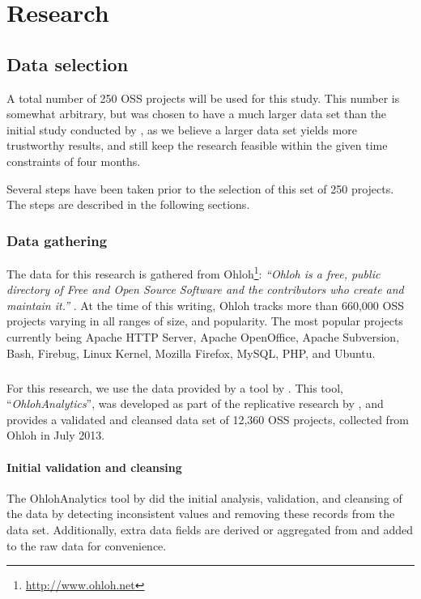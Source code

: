 \chapter{Research}
\label{research}

\section{Data selection}
\label{method:data}
A total number of 250 OSS projects will be used for this study. This number is
somewhat arbitrary, but was chosen to have a much larger data set than the
initial study conducted by \citet{karus2013}, as we believe a larger data
set yields more trustworthy results, and still keep the research feasible
within the given time constraints of four months.

Several steps have been taken prior to the selection of this set of 250
projects. The steps are described in the following sections.

\subsection{Data gathering}
The data for this research is gathered from
Ohloh\footnote{\url{http://www.ohloh.net}}: \emph{``Ohloh is a free, public
directory of Free and Open Source Software and the contributors who create and
maintain it.'' }\rm \cite{ohloh}. At the time of this writing, Ohloh tracks more
than 660,000 OSS projects varying in all ranges of size, and popularity. The
most popular projects currently being Apache HTTP Server, Apache OpenOffice,
Apache Subversion, Bash, Firebug, Linux Kernel, Mozilla Firefox, MySQL, PHP,
and Ubuntu.

\paragraph{}
For this research, we use the data provided by a tool by \citet{ohlohanalytics}.
This tool, ``\emph{OhlohAnalytics}\rm'', was developed as part of the
replicative research by \citet{bruntink2014}, and provides a validated and
cleansed data set of 12,360 OSS projects, collected from Ohloh in July 2013.

\subsubsection{Initial validation and cleansing}
The OhlohAnalytics tool by \citet{ohlohanalytics} did the initial analysis,
validation, and cleansing of the data by detecting inconsistent values and
removing these records from the data set. Additionally, extra data fields are
derived or aggregated from and added to the raw data for convenience.

